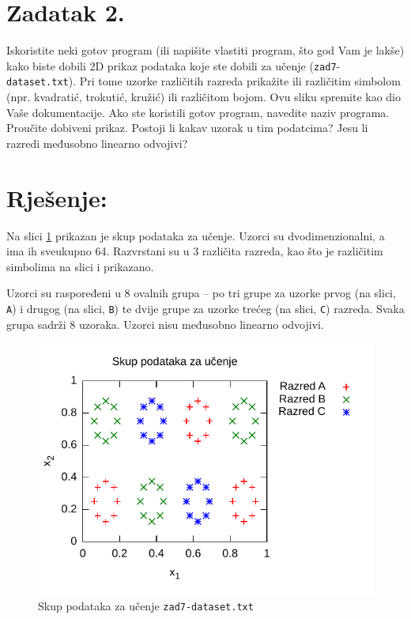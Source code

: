 \documentclass{article}
\begin{document}
\pagebreak

\section*{Zadatak 2.}
Iskoristite neki gotov program (ili napišite vlastiti
program, što god Vam je lakše) kako biste dobili 2D prikaz
podataka koje ste dobili za učenje
(\texttt{zad7}-\texttt{dataset.txt}). Pri tome uzorke
različitih razreda prikažite ili različitim simbolom (npr.
kvadratić, trokutić, kružić) ili različitom bojom. Ovu sliku
spremite kao dio Vaše dokumentacije. Ako ste koristili gotov
program, navedite naziv programa.\\
Proučite dobiveni prikaz. Postoji li kakav uzorak u tim
podatcima? Jesu li razredi međusobno linearno odvojivi?

\section*{Rješenje:}
Na slici \ref{z2-1} prikazan je skup podataka za učenje.
Uzorci su dvodimenzionalni, a ima ih sveukupno 64. Razvrstani
su u 3 različita razreda, kao što je različitim simbolima na
slici i prikazano.

Uzorci su raspoređeni u 8 ovalnih grupa -- po tri grupe za
uzorke prvog (na slici, \texttt{A}) i drugog (na slici,
\texttt{B}) te dvije grupe za uzorke trećeg (na slici,
\texttt{C}) razreda. Svaka grupa sadrži 8 uzoraka. Uzorci
nisu međusobno linearno odvojivi.

\begin{figure}
    \centering
    \includegraphics{img/task2-plot.pdf}
    \caption{Skup podataka za učenje
    \texttt{zad7-dataset.txt}}
    \label{z2-1}
\end{figure}
\end{document}
